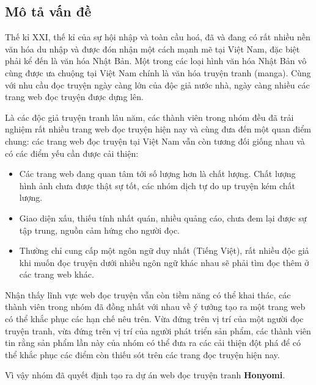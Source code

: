 \documentclass[./../main.tex]{subfiles}
\begin{document}
\subsection{Mô tả vấn đề}

Thế kỉ XXI, thế kỉ của sự hội nhập và toàn cầu hoá, đã và đang có rất nhiều nền văn hóa du nhập và được đón nhận một cách mạnh mẽ tại Việt Nam, đặc biệt phải kể đến là văn hóa Nhật Bản. Một trong các loại hình văn hóa Nhật Bản vô cùng được ưa chuộng tại Việt Nam chính là văn hóa truyện tranh (manga). Cùng với nhu cầu đọc truyện ngày càng lớn của độc giả nước nhà, ngày càng nhiều các trang web đọc truyện được dựng lên.

Là các độc giả truyện tranh lâu năm, các thành viên trong nhóm đều đã trải nghiệm rất nhiều trang web đọc truyện hiện nay và cùng đưa đến một quan điểm chung: các trang web đọc truyện tại Việt Nam vẫn còn tương đối giống nhau và có các điểm yếu cần được cải thiện:

\begin{itemize}
	\item Các trang web đang quan tâm tới số lượng hơn là chất lượng. Chất lượng hình ảnh chưa được thật sự tốt, các nhóm dịch tự do up truyện kém chất lượng.
	\item Giao diện xấu, thiếu tính nhất quán, nhiều quảng cáo, chưa đem lại được sự tập trung, nguồn cảm hứng cho người đọc.
	\item Thường chỉ cung cấp một ngôn ngữ duy nhất (Tiếng Việt), rất nhiều độc giả khi muốn đọc truyện dưới nhiều ngôn ngữ khác nhau sẽ phải tìm đọc thêm ở các trang web khác.
\end{itemize}

Nhận thấy lĩnh vực web đọc truyện vẫn còn tiềm năng có thể khai thác, các thành viên trong nhóm đã đồng nhất với nhau về ý tưởng tạo ra một trang web có thể khắc phục các hạn chế nêu trên. Vừa đứng trên vị trí của một người đọc truyện tranh, vừa đứng trên vị trí của người phát triển sản phẩm, các thành viên tin rằng sản phẩm lần này của nhóm có thể đưa ra các cải thiện đột phá để có thể khắc phục các điểm còn thiếu sót trên các trang đọc truyện hiện nay.

Vì vậy nhóm đã quyết định tạo ra dự án web đọc truyện tranh \textbf{Honyomi}.
\end{document}
